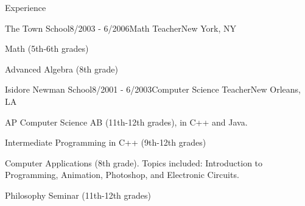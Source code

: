 \documentclass{resume} %
\begin{document}
\begin{rSection}{Experience}
\begin{rSubsection}{The Town School}{8/2003 - 6/2006}{Math Teacher}{New York, NY}
\item Math (5th-6th grades)
\item Advanced Algebra (8th grade)
\end{rSubsection}

\begin{rSubsection}{Isidore Newman School}{8/2001 - 6/2003}{Computer Science Teacher}{New Orleans, LA}
\item AP Computer Science AB (11th-12th grades), in C++ and Java.
\item Intermediate Programming in C++ (9th-12th grades)
\item Computer Applications (8th grade). Topics included: Introduction to Programming, Animation, Photoshop, and Electronic Circuits.
\item Philosophy Seminar (11th-12th grades)
\end{rSubsection}

\end{rSection}






\end{document}
